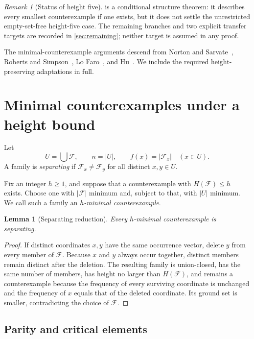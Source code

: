 \documentclass[11pt,reqno]{amsart}
\numberwithin{equation}{section}
\newtheorem{lemma}[lemma]{Lemma}
\theoremstyle{definition}
\theoremstyle{remark}
\newtheorem{remark}[remark]{Remark}
\newcommand{\F}{\mathcal{F}}
\newcommand{\1}{\mathbf{1}}
\newcommand{\abs}[1]{\left|#1\right|}
\begin{document}
\begin{remark}[Status of height five]\label{rem:height5-status}
 is a conditional structure theorem: it describes every smallest counterexample if one exists, but it does not settle the unrestricted empty-set-free height-five case.  The remaining branches and two explicit transfer targets are recorded in \cref{sec:remaining}; neither target is assumed in any proof.
\end{remark}

The minimal-counterexample arguments descend from Norton and Sarvate~\cite{NortonSarvate}, Roberts and Simpson~\cite{RobertsSimpson}, Lo Faro~\cite{LoFaro}, and Hu~\cite{Hu}.  We include the required height-preserving adaptations in full.

\section{Minimal counterexamples under a height bound}

Let
\[
U=\bigcup\F,
\qquad n=\abs{U},
\qquad
f(x)=\abs{\F_x}\quad(x\in U).
\]
A family is \emph{separating} if \(\F_x\ne\F_y\) for all distinct \(x,y\in U\).

Fix an integer \(h\ge 1\), and suppose that a counterexample with \(H(\F)\le h\) exists.  Choose one with \(\abs{\F}\) minimum and, subject to that, with \(\abs{U}\) minimum.  We call such a family an \emph{\(h\)-minimal counterexample}.

\begin{lemma}[Separating reduction]\label{lem:separating}
Every \(h\)-minimal counterexample is separating.
\end{lemma}

\begin{proof}
If distinct coordinates \(x,y\) have the same occurrence vector, delete \(y\) from every member of \(\F\).  Because \(x\) and \(y\) always occur together, distinct members remain distinct after the deletion.  The resulting family is union-closed, has the same number of members, has height no larger than \(H(\F)\), and remains a counterexample because the frequency of every surviving coordinate is unchanged and the frequency of \(x\) equals that of the deleted coordinate.  Its ground set is smaller, contradicting the choice of \(\F\).
\end{proof}

\subsection{Parity and critical elements}
\end{document}
